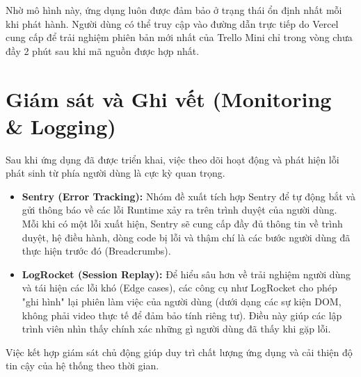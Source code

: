 Nhờ mô hình này, ứng dụng luôn được đảm bảo ở trạng thái ổn định nhất mỗi khi phát hành. Người dùng có thể truy cập vào đường dẫn trực tiếp do Vercel cung cấp để trải nghiệm phiên bản mới nhất của Trello Mini chỉ trong vòng chưa đầy 2 phút sau khi mã nguồn được hợp nhất.

\section{Giám sát và Ghi vết (Monitoring \& Logging)}
Sau khi ứng dụng đã được triển khai, việc theo dõi hoạt động và phát hiện lỗi phát sinh từ phía người dùng là cực kỳ quan trọng.

\begin{itemize}
    \item \textbf{Sentry (Error Tracking):} Nhóm đề xuất tích hợp Sentry để tự động bắt và gửi thông báo về các lỗi Runtime xảy ra trên trình duyệt của người dùng. Mỗi khi có một lỗi xuất hiện, Sentry sẽ cung cấp đầy đủ thông tin về trình duyệt, hệ điều hành, dòng code bị lỗi và thậm chí là các bước người dùng đã thực hiện trước đó (Breadcrumbs).
    \item \textbf{LogRocket (Session Replay):} Để hiểu sâu hơn về trải nghiệm người dùng và tái hiện các lỗi khó (Edge cases), các công cụ như LogRocket cho phép "ghi hình" lại phiên làm việc của người dùng (dưới dạng các sự kiện DOM, không phải video thực tế để đảm bảo tính riêng tư). Điều này giúp các lập trình viên nhìn thấy chính xác những gì người dùng đã thấy khi gặp lỗi.
\end{itemize}
Việc kết hợp giám sát chủ động giúp duy trì chất lượng ứng dụng và cải thiện độ tin cậy của hệ thống theo thời gian.

